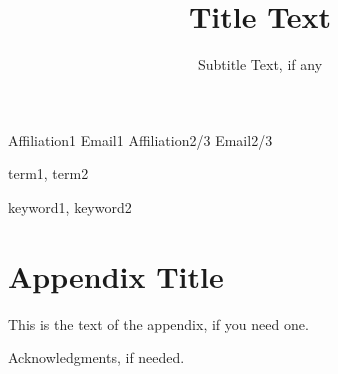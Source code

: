 \documentclass[preprint]{sigplanconf}
\begin{document}
\setlength{\pdfpageheight}{\paperheight}
\setlength{\pdfpagewidth}{\paperwidth}




\title{Title Text}
\subtitle{Subtitle Text, if any}

           {Affiliation1}
           {Email1}
           {Affiliation2/3}
           {Email2/3}

\maketitle

\begin{abstract}

\end{abstract}


\terms
term1, term2

\keywords
keyword1, keyword2



%
%
%

\appendix
\section{Appendix Title}

This is the text of the appendix, if you need one.

\acks

Acknowledgments, if needed.








\end{document}
